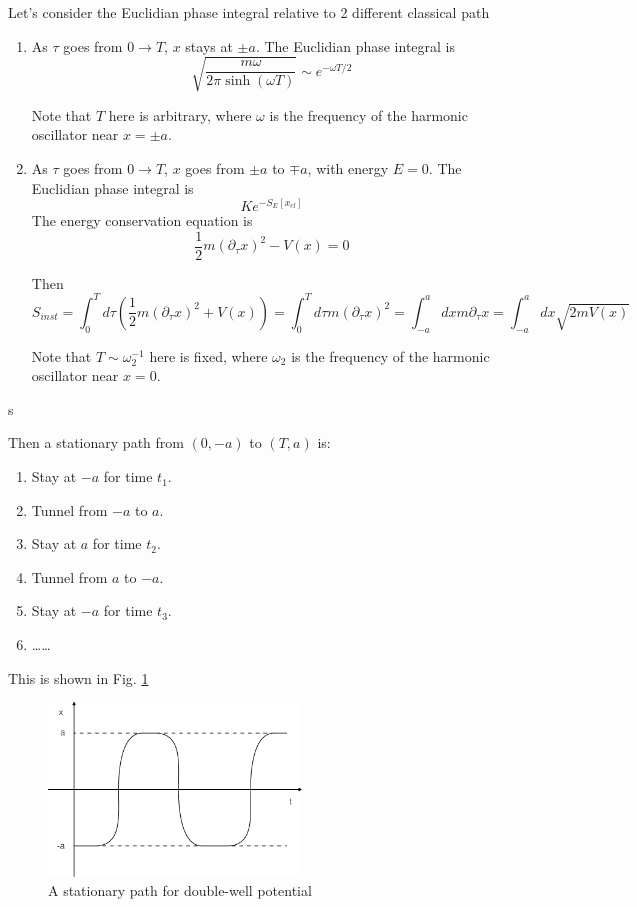 \documentclass[12pt]{book}
\begin{document}
	Let's consider the Euclidian phase integral relative to 2 different classical path
	\begin{enumerate}
		\item As $\tau$ goes from $0\rightarrow T$, $x$ stays at $\pm a$. The Euclidian phase integral is
			\begin{equation}
				\sqrt{\frac{m\omega}{2\pi \sinh(\omega T)}}\sim e^{-\omega T/2}
			\end{equation}
			
			Note that $T$ here is arbitrary, where $\omega$ is the frequency of the harmonic oscillator near $x=\pm a$.
		\item As $\tau$ goes from $0\rightarrow T$, $x$ goes from $\pm a$ to $\mp a$, with energy $E=0$. The Euclidian phase integral is
			\begin{equation}
				Ke^{-S_E[x_{cl}]}
			\end{equation}
			The energy conservation equation is
			\begin{equation}
				\frac 12 m(\partial_\tau x)^2-V(x)=0
			\end{equation}
			
			Then
			\begin{equation}
				S_{inst}=\int_0^Td\tau (\frac 12 m(\partial_\tau x)^2+V(x))=\int_0^Td\tau m(\partial_\tau x)^2=\int_{-a}^a dx m\partial_\tau x=\int_{-a}^a dx \sqrt{2mV(x)}
			\end{equation}
			
			Note that $T\sim \omega_2^{-1}$ here is fixed, where $\omega_2$ is the frequency of the harmonic oscillator near $x=0$.
	\end{enumerate}s
	
	Then a stationary path from $(0,-a)$ to $(T,a)$ is: 
	\begin{enumerate}
		\item Stay at $-a$ for time $t_1$.
		\item Tunnel from $-a$ to $a$.
		\item Stay at $a$ for time $t_2$.
		\item Tunnel from $a$ to $-a$.
		\item Stay at $-a$ for time $t_3$.
		\item \dots\dots
	\end{enumerate}
	This is shown in Fig. \ref{fig:dblwell_path} 
	
	\begin{figure}[htb!]
		\centering  
		\includegraphics[width=0.6\textwidth]{resources/chap_path_int/dbw_path.pdf}
		\caption{A stationary path for double-well potential}
		\label{fig:dblwell_path} 
	\end{figure}
	
\end{document}
